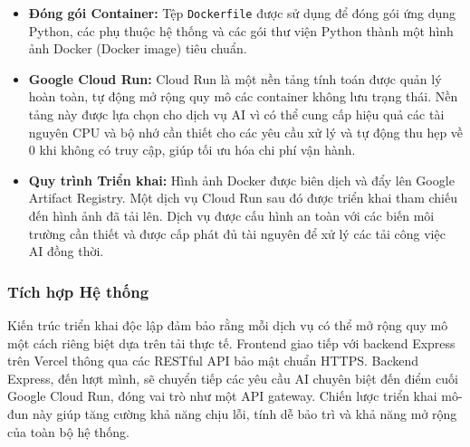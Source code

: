 \begin{itemize}
    \item \textbf{Đóng gói Container:} Tệp \texttt{Dockerfile} được sử dụng để đóng gói ứng dụng Python, các phụ thuộc hệ thống và các gói thư viện Python thành một hình ảnh Docker (Docker image) tiêu chuẩn.
    \item \textbf{Google Cloud Run:} Cloud Run là một nền tảng tính toán được quản lý hoàn toàn, tự động mở rộng quy mô các container không lưu trạng thái. Nền tảng này được lựa chọn cho dịch vụ AI vì có thể cung cấp hiệu quả các tài nguyên CPU và bộ nhớ cần thiết cho các yêu cầu xử lý và tự động thu hẹp về 0 khi không có truy cập, giúp tối ưu hóa chi phí vận hành.
    \item \textbf{Quy trình Triển khai:} Hình ảnh Docker được biên dịch và đẩy lên Google Artifact Registry. Một dịch vụ Cloud Run sau đó được triển khai tham chiếu đến hình ảnh đã tải lên. Dịch vụ được cấu hình an toàn với các biến môi trường cần thiết và được cấp phát đủ tài nguyên để xử lý các tải công việc AI đồng thời.
\end{itemize}

\subsubsection{Tích hợp Hệ thống}
Kiến trúc triển khai độc lập đảm bảo rằng mỗi dịch vụ có thể mở rộng quy mô một cách riêng biệt dựa trên tải thực tế. Frontend giao tiếp với backend Express trên Vercel thông qua các RESTful API bảo mật chuẩn HTTPS. Backend Express, đến lượt mình, sẽ chuyển tiếp các yêu cầu AI chuyên biệt đến điểm cuối Google Cloud Run, đóng vai trò như một API gateway. Chiến lược triển khai mô-đun này giúp tăng cường khả năng chịu lỗi, tính dễ bảo trì và khả năng mở rộng của toàn bộ hệ thống.

\endgroup